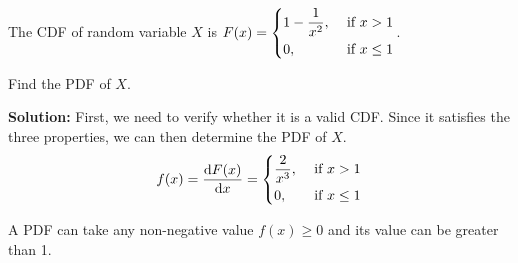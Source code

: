 \begin{eg}
    The CDF of random variable \(X\) is \(F(x) = \begin{dcases}
        1 - \frac{1}{x^2}, &\text{ if } x > 1 \\
        0, &\text{ if } x \leq 1 
    \end{dcases}\). 
    
    Find the PDF of \(X\).

    \textbf{Solution:} 
    First, we need to verify whether it is a valid CDF. Since it satisfies the three properties, we can then determine the PDF of \(X\).
    \[
        f(x) = \frac{\mathrm{d}F(x)}{\mathrm{d}x} = \begin{dcases}
            \dfrac{2}{x^3}, &\text{ if } x > 1 \\
            0 , &\text{ if } x \leq 1 
        \end{dcases}
    \] 
\end{eg}
\begin{remark}
    A PDF can take any non-negative value \(f(x) \geq 0\) and its value can be greater than 1.
\end{remark}

